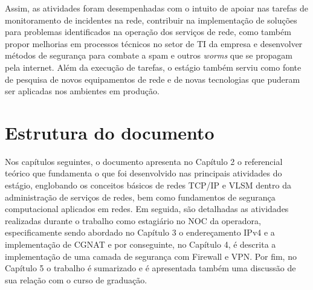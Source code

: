     Assim, as atividades foram desempenhadas com o intuito de apoiar nas tarefas de monitoramento de incidentes na rede, contribuir na implementação de soluções para problemas identificados na operação dos serviços de rede, como também propor melhorias em processos técnicos no setor de TI da empresa e desenvolver métodos de segurança para combate a spam e outros \textit{worms} que se propagam pela internet. Além da execução de tarefas, o estágio também serviu como fonte de pesquisa de novos equipamentos de rede e de novas tecnologias que puderam ser aplicadas nos ambientes em produção.

\section{Estrutura do documento}

    Nos capítulos seguintes, o documento apresenta no Capítulo 2 o referencial teórico que fundamenta o que foi desenvolvido nas principais atividades do estágio, englobando os conceitos básicos de redes TCP/IP e VLSM dentro da administração de serviços de redes, bem como fundamentos de segurança computacional aplicados em redes. Em seguida, são detalhadas as atividades realizadas durante o trabalho como estagiário no NOC da operadora, especificamente sendo abordado no Capítulo 3 o endereçamento IPv4 e a implementação de CGNAT e por conseguinte, no Capítulo 4, é descrita a implementação de uma camada de segurança com Firewall e VPN. Por fim, no Capítulo 5 o trabalho é sumarizado e é apresentada também uma discussão de sua relação com o curso de graduação.
    
